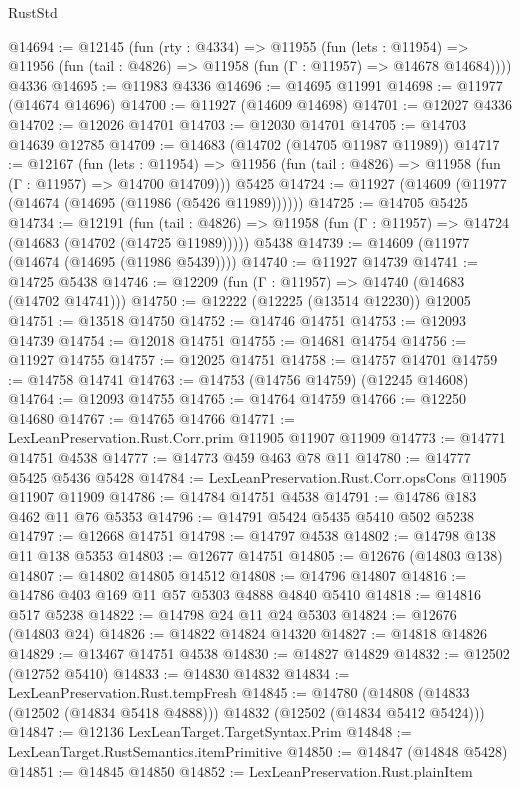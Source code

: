 \begin{lexlean}{RustStd}
\begin{coremodule}
@14694 := @12145
    (fun (rty : @4334) =>
    @11955
      (fun (lets : @11954) =>
      @11956 (fun (tail : @4826) => @11958 (fun (Γ : @11957) => @14678 @14684))))
    @4336
@14695 := @11983 @4336
@14696 := @14695 @11991
@14698 := @11977 (@14674 @14696)
@14700 := @11927 (@14609 @14698)
@14701 := @12027 @4336
@14702 := @12026 @14701
@14703 := @12030 @14701
@14705 := @14703 @14639 @12785
@14709 := @14683 (@14702 (@14705 @11987 @11989))
@14717 := @12167
    (fun (lets : @11954) =>
    @11956 (fun (tail : @4826) => @11958 (fun (Γ : @11957) => @14700 @14709)))
    @5425
@14724 := @11927 (@14609 (@11977 (@14674 (@14695 (@11986 (@5426 @11989))))))
@14725 := @14705 @5425
@14734 := @12191
    (fun (tail : @4826) => @11958 (fun (Γ : @11957) => @14724 (@14683 (@14702 (@14725 @11989)))))
    @5438
@14739 := @14609 (@11977 (@14674 (@14695 (@11986 @5439))))
@14740 := @11927 @14739
@14741 := @14725 @5438
@14746 := @12209 (fun (Γ : @11957) => @14740 (@14683 (@14702 @14741)))
@14750 := @12222 (@12225 (@13514 @12230)) @12005
@14751 := @13518 @14750
@14752 := @14746 @14751
@14753 := @12093 @14739
@14754 := @12018 @14751
@14755 := @14681 @14754
@14756 := @11927 @14755
@14757 := @12025 @14751
@14758 := @14757 @14701
@14759 := @14758 @14741
@14763 := @14753 (@14756 @14759) (@12245 @14608)
@14764 := @12093 @14755
@14765 := @14764 @14759
@14766 := @12250 @14680
@14767 := @14765 @14766
@14771 := LexLeanPreservation.Rust.Corr.prim @11905 @11907 @11909
@14773 := @14771 @14751 @4538
@14777 := @14773 @459 @463 @78 @11
@14780 := @14777 @5425 @5436 @5428
@14784 := LexLeanPreservation.Rust.Corr.opsCons @11905 @11907 @11909
@14786 := @14784 @14751 @4538
@14791 := @14786 @183 @462 @11 @76 @5353
@14796 := @14791 @5424 @5435 @5410 @502 @5238
@14797 := @12668 @14751
@14798 := @14797 @4538
@14802 := @14798 @138 @11 @138 @5353
@14803 := @12677 @14751
@14805 := @12676 (@14803 @138)
@14807 := @14802 @14805 @14512
@14808 := @14796 @14807
@14816 := @14786 @403 @169 @11 @57 @5303 @4888 @4840 @5410
@14818 := @14816 @517 @5238
@14822 := @14798 @24 @11 @24 @5303
@14824 := @12676 (@14803 @24)
@14826 := @14822 @14824 @14320
@14827 := @14818 @14826
@14829 := @13467 @14751 @4538
@14830 := @14827 @14829
@14832 := @12502 (@12752 @5410)
@14833 := @14830 @14832
@14834 := LexLeanPreservation.Rust.tempFresh
@14845 := @14780
    (@14808 (@14833 (@12502 (@14834 @5418 @4888))) @14832 (@12502 (@14834 @5412 @5424)))
@14847 := @12136 LexLeanTarget.TargetSyntax.Prim
@14848 := LexLeanTarget.RustSemantics.itemPrimitive
@14850 := @14847 (@14848 @5428)
@14851 := @14845 @14850
@14852 := LexLeanPreservation.Rust.plainItem

\end{coremodule}
\end{lexlean}

